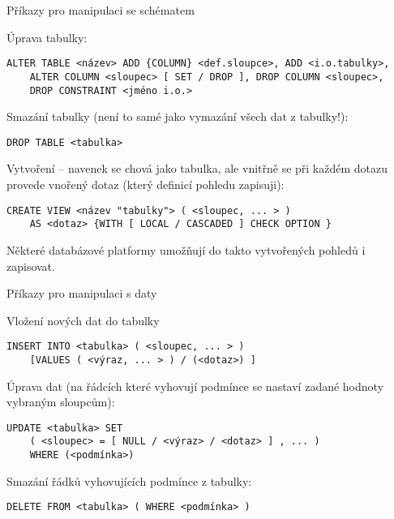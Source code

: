\medskip
\begin{obecne}{Příkazy pro manipulaci se schématem}
\begin{pitemize}
    \item Úprava tabulky:
\begin{verbatim}
ALTER TABLE <název> ADD {COLUMN} <def.sloupce>, ADD <i.o.tabulky>, 
    ALTER COLUMN <sloupec> [ SET / DROP ], DROP COLUMN <sloupec>, 
    DROP CONSTRAINT <jméno i.o.> 
\end{verbatim}
    \item Smazání tabulky (není to samé jako vymazání všech dat z tabulky!):
\begin{verbatim}
DROP TABLE <tabulka> 
\end{verbatim}
    \item Vytvoření  -- navenek se chová jako tabulka, ale vnitřně se při každém dotazu provede vnořený dotaz (který definicí pohledu zapisuji):
\begin{verbatim}
CREATE VIEW <název "tabulky"> ( <sloupec, ... > ) 
    AS <dotaz> {WITH [ LOCAL / CASCADED ] CHECK OPTION }
\end{verbatim}
    Některé databázové platformy umožňují do takto vytvořených pohledů i zapisovat.
\end{pitemize}
\end{obecne}

\medskip
\begin{obecne}{Příkazy pro manipulaci s daty}
\begin{pitemize}
    \item Vložení nových dat do tabulky
\begin{verbatim}
INSERT INTO <tabulka> ( <sloupec, ... > ) 
    [VALUES ( <výraz, ... > ) / (<dotaz>) ] 
\end{verbatim}
    \item Úprava dat (na řádcích které vyhovují podmínce se nastaví zadané hodnoty vybraným sloupcům):
\begin{verbatim}
UPDATE <tabulka> SET 
    ( <sloupec> = [ NULL / <výraz> / <dotaz> ] , ... ) 
    WHERE (<podmínka>) 
\end{verbatim}
    \item Smazání řádků vyhovujících podmínce z tabulky:
\begin{verbatim}
DELETE FROM <tabulka> ( WHERE <podmínka> ) 
\end{verbatim}
\end{pitemize}
\end{obecne}
